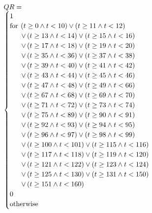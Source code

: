 \documentclass[10pt,journal]{IEEEtran}
\begin{document}
\begin{equation}
 \begin{minipage}{250pt}
\begin{flushleft} $\displaystyle QR = \begin{cases} 1 & \\  \text{for}\: \left(t \geq 0 \wedge t < 10\right) \vee \left(t \geq 11 \wedge t < 12 \right) \\ \quad \ \  \vee \left(t \geq 13 \wedge t < 14\right) \vee \left(t \geq 15 \wedge t < 16 \right) \\ \quad \ \  \vee \left(t \geq 17 \wedge t < 18\right) \vee \left(t \geq 19 \wedge t < 20\right) \\ \quad \ \  \vee \left(t \geq 35 \wedge t < 36\right) \vee \left(t \geq 37 \wedge t < 38\right) \\ \quad \ \  \vee \left(t \geq 39 \wedge t < 40\right) \vee \left(t \geq 41 \wedge t < 42\right) \\ \quad \ \  \vee \left(t \geq 43 \wedge t < 44\right) \vee \left(t \geq 45 \wedge t < 46\right) \\ \quad \ \  \vee \left(t \geq 47 \wedge t < 48\right) \vee \left(t \geq 49 \wedge t < 66 \right) \\ \quad \ \  \vee \left(t \geq 67 \wedge t < 68\right) \vee \left(t \geq 69 \wedge t < 70\right) \\ \quad \ \  \vee \left(t \geq 71 \wedge t < 72\right) \vee \left(t \geq 73 \wedge t < 74\right) \\ \quad \ \  \vee \left(t \geq 75 \wedge t < 89\right) \vee \left(t \geq 90 \wedge t < 91 \right) \\ \quad \ \  \vee \left(t \geq 92 \wedge t < 93\right) \vee \left(t \geq 94 \wedge t < 95\right) \\ \quad \ \  \vee \left(t \geq 96 \wedge t < 97\right) \vee \left(t \geq 98 \wedge t < 99\right) \\ \quad \ \  \vee \left(t \geq 100 \wedge t < 101\right) \vee \left(t \geq 115 \wedge t < 116\right) \\ \quad \ \  \vee \left(t \geq 117 \wedge t < 118\right) \vee \left(t \geq 119 \wedge t < 120 \right) \\ \quad \ \  \vee \left(t \geq 121 \wedge t < 122\right) \vee \left(t \geq 123 \wedge t < 124\right) \\ \quad \ \  \vee \left(t \geq 125 \wedge t < 130\right) \vee \left(t \geq 131 \wedge t < 150\right) \\ \quad \ \  \vee \left(t \geq 151 \wedge t < 160\right) \\0 & \\  \text{otherwise} \end{cases}$  \end{flushleft}
 \end{minipage}
 \end{equation}
\end{document}
